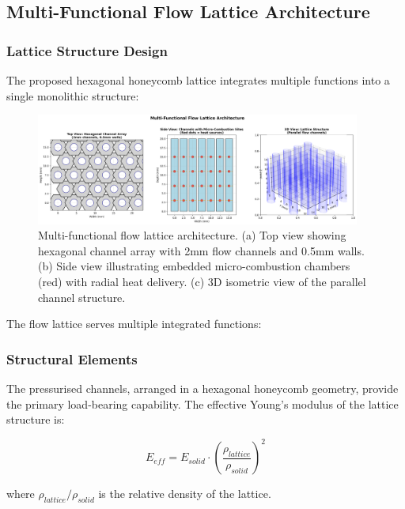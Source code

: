 \subsection{Multi-Functional Flow Lattice Architecture}

\subsubsection{Lattice Structure Design}

The proposed hexagonal honeycomb lattice integrates multiple functions into a single monolithic structure:

\begin{figure}[H]
    \centering
    \includegraphics[width=0.95\textwidth]{figures/simulations/lattice_structure_views.png}
    \caption{Multi-functional flow lattice architecture. (a) Top view showing hexagonal channel array with 2mm flow channels and 0.5mm walls. (b) Side view illustrating embedded micro-combustion chambers (red) with radial heat delivery. (c) 3D isometric view of the parallel channel structure.}
    \label{fig:lattice_structure}
\end{figure}

The flow lattice serves multiple integrated functions:

\subsubsection{Structural Elements}
The pressurised channels, arranged in a hexagonal honeycomb geometry, provide the primary load-bearing capability. The effective Young's modulus of the lattice structure is:

\begin{equation}
    E_{eff} = E_{solid} \cdot \left(\frac{\rho_{lattice}}{\rho_{solid}}\right)^2
\end{equation}

where $\rho_{lattice}/\rho_{solid}$ is the relative density of the lattice.


